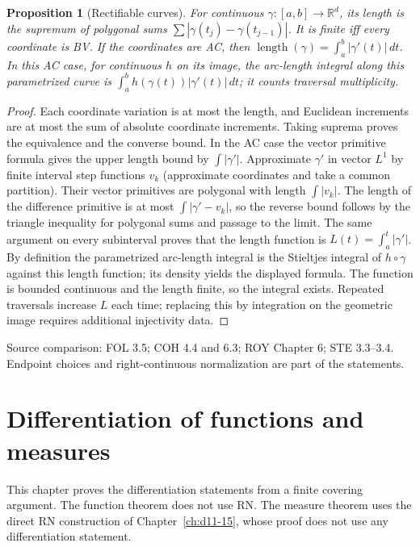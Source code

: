 \documentclass[11pt,oneside,openany]{book}
\newtheorem{proposition}[theorem]{Proposition}
\theoremstyle{definition}
\theoremstyle{remark}
\newcommand{\R}{\mathbb R}\newcommand{\C}{\mathbb C}
\newcommand{\family}[1]{}
\newcommand{\source}[1]{\par\begingroup\small\sffamily\color{black!65}Source comparison: #1\par\endgroup}
\begin{document}
\begin{proposition}[Rectifiable curves]\family{D11.12.rectifiable_curve_bridge}\label{d11:12:rectifiable-curve-bridge}
For continuous $\gamma:[a,b]\to\R^d$, its length is the supremum of
polygonal sums $\sum|\gamma(t_j)-\gamma(t_{j-1})|$. It is finite iff
every coordinate is BV. If the coordinates are AC, then
$\operatorname{length}(\gamma)=\int_a^b|\gamma'(t)|\,dt$.
In this AC case, for continuous $h$ on its image, the arc-length integral along this
parametrized curve is $\int_a^bh(\gamma(t))|\gamma'(t)|\,dt$;
it counts traversal multiplicity.
\end{proposition}
\begin{proof}
Each coordinate variation is at most the length, and Euclidean increments
are at most the sum of absolute coordinate increments. Taking suprema
proves the equivalence and the converse bound. In the AC case the vector
primitive formula gives the upper length bound by $\int|\gamma'|$.
Approximate $\gamma'$ in vector $L^1$ by finite interval step functions
$v_k$ (approximate coordinates and take a common partition). Their vector
primitives are polygonal with length $\int|v_k|$. The length of the
difference primitive is at most $\int|\gamma'-v_k|$, so the reverse
bound follows by the triangle inequality for polygonal sums and passage
to the limit. The same argument on every subinterval proves that the
length function is $L(t)=\int_a^t|\gamma'|$. By definition the
parametrized arc-length integral is the Stieltjes integral of $h\circ\gamma$
against this length function; its density yields the displayed formula.
The function is bounded continuous and the length finite, so the integral
exists. Repeated traversals increase $L$ each time; replacing this by
integration on the geometric image requires additional injectivity data.
\end{proof}
\source{FOL 3.5; COH 4.4 and 6.3; ROY Chapter 6; STE 3.3--3.4. Endpoint choices and right-continuous normalization are part of the statements.}



\chapter{Differentiation of functions and measures}\label{ch:d11-13}

This chapter proves the differentiation statements from a finite covering
argument. The function theorem does not use RN. The measure theorem uses
the direct RN construction of Chapter~\ref{ch:d11-15}, whose proof does not
use any differentiation statement.
\end{document}
